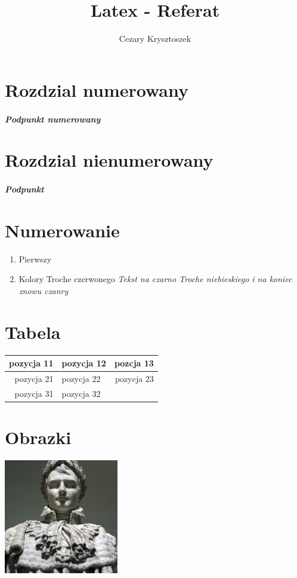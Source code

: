 \documentclass[a4paper]{article}
\title{Latex - Referat}
\author{Cezary Krysztoszek}
\begin{document}
\maketitle 
\tableofcontents %
\section{Rozdzial numerowany}
\subparagraph{Podpunkt numerowany}

\section*{Rozdzial nienumerowany}
\subparagraph*{Podpunkt}
\section {Numerowanie}
\begin{enumerate}
\item Pierwszy
\item Kolory \newline
{\color{red} Troche czerwonego} \newline %
\emph{Tekst na czarno {\color{blue} Troche niebieskiego} i na koniec znowu czanry}
\end{enumerate}
\section{Tabela}
\begin{tabular}{|r|l r|}  %
  \hline 
  pozycja 11 & pozycja 12 & pozcja 13\\
  \hline
  pozycja 21 & pozycja 22 & pozycja 23 \\
  \hline %
  pozycja 31 & pozycja 32 
  
\end{tabular} 
\section{Obrazki}
\includegraphics[width=5cm, height=5cm]{obrazek1}
\newpage %
\end{document}
